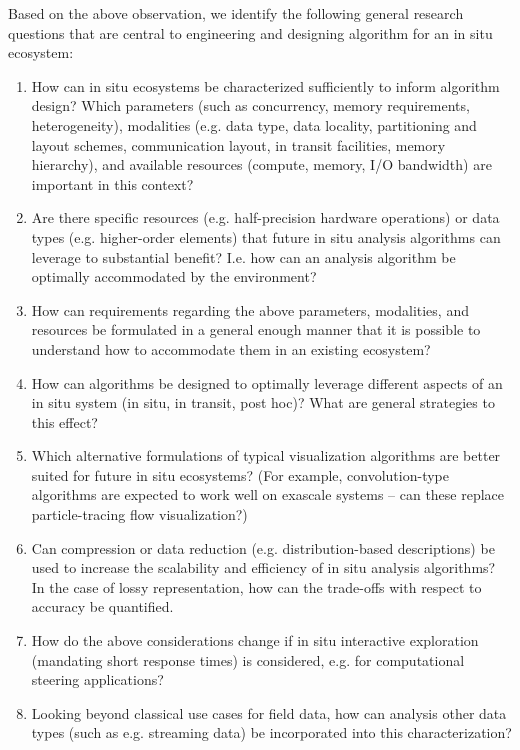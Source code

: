 \begin{refsection}
Based on the above observation, we identify the following general research questions that are central to engineering and designing algorithm for an in situ ecosystem:
\begin{enumerate}
\item 
How can in situ ecosystems be characterized sufficiently to inform algorithm design? Which parameters (such as concurrency, memory requirements, heterogeneity), modalities (e.g. data type, data locality, partitioning and layout schemes, communication layout, in transit facilities, memory hierarchy), and available resources (compute, memory, I/O bandwidth) are important in this context?
\item
Are there specific resources (e.g. half-precision hardware operations) or data types (e.g. higher-order elements) that future in situ analysis algorithms can leverage to substantial benefit? I.e. how can an analysis algorithm be optimally accommodated by the environment?
\item
How can requirements regarding the above parameters, modalities, and resources be formulated in a general enough manner that it is possible to understand how to  accommodate them in an existing ecosystem?
\item
How can algorithms be designed to optimally leverage different aspects of an in situ system (in situ, in transit, post hoc)? What are general strategies to this effect?
\item
Which alternative formulations of typical visualization algorithms are better suited for future in situ ecosystems? (For example, convolution-type algorithms are expected to work well on exascale systems – can these replace particle-tracing flow visualization?)
\item
Can compression or data reduction (e.g. distribution-based descriptions) be used to increase the scalability and efficiency of in situ analysis algorithms? In the case of lossy representation, how can the trade-offs with respect to accuracy be quantified.
\item
How do the above considerations change if in situ interactive exploration (mandating short response times)  is considered, e.g. for computational steering applications?
\item
Looking beyond classical use cases for field data, how can analysis other data types (such as e.g. streaming data) be incorporated into this characterization?
\end{enumerate}


\end{refsection}
